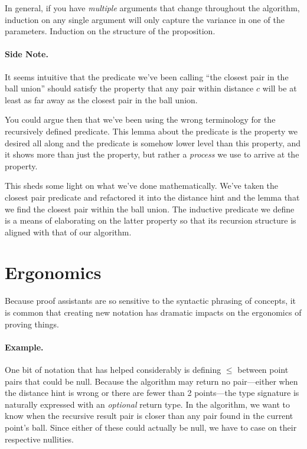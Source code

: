 \documentclass{article}
\begin{document}
In general, if you have \textit{multiple} arguments that change throughout the algorithm, induction on any single argument will only capture the variance in one of the parameters.
Induction on the structure of the proposition.

\paragraph{Side Note.} It seems intuitive that the predicate we've been calling ``the closest pair in the ball union'' should satisfy the property that any pair within distance $c$ will be at least as far away as the closest pair in the ball union.

You could argue then that we've been using the wrong terminology for the recursively defined predicate.
This lemma about the predicate is the property we desired all along and the predicate is somehow lower level than this property, and it shows more than just the property, but rather a \textit{process} we use to arrive at the property.

This sheds some light on what we've done mathematically.
We've taken the closest pair predicate and refactored it into the distance hint and the lemma that we find the closest pair within the ball union.
The inductive predicate we define is a means of elaborating on the latter property so that its recursion structure is aligned with that of our algorithm.


\section{Ergonomics}
Because proof assistants are so sensitive to the syntactic phrasing of concepts, it is common that creating new notation has dramatic impacts on the ergonomics of proving things.

\paragraph{Example.}
One bit of notation that has helped considerably is defining $\leq$ between point pairs that could be null.
Because the algorithm may return no pair---either when the distance hint is wrong or there are fewer than 2 points---the type signature is naturally expressed with an \textit{optional} return type.
In the algorithm, we want to know when the recursive result pair is closer than any pair found in the current point's ball.
Since either of these could actually be null, we have to case on their respective nullities.
\end{document}
